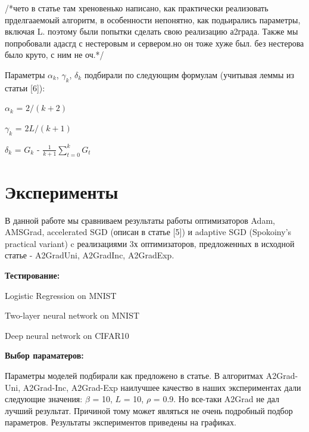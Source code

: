 \documentclass[a4paper,12pt]{article}
\theoremstyle{plain} %
\theoremstyle{definition} %
\theoremstyle{remark} %
\theoremstyle{definition}
\theoremstyle{definition}
\begin{document}
	
	/*чето в статье там хреновенько написано, как практически реализовать прделгааемоый алгоритм, в особенности непонятно, как подьирались параметры, включая L. поэтому были попытки сделать свою реализацию а2града.  Также мы попробовали адасгд с нестеровым и сервером.но он тоже хуже был. без нестерова было круто, с ним не оч.*/
	
	Параметры $\alpha_k$, $\gamma_k$, $\delta_k$ подбирали по следующим формулам (учитывая леммы из статьи [6]): 
	
	$\alpha_k$ = $2 / (k + 2)$
	
	$\gamma_k$ = $2L / (k + 1)$
	
	$\delta_k$ = $G_k$ - $\frac{1}{k+1} \sum^k_{t=0}{G_t}$
	
	\section{Эксперименты}
	
	
	В данной работе мы сравниваем результаты работы оптимизаторов Adam, AMSGrad, accelerated SGD (описан в статье [5]) и adaptive SGD (Spokoiny's practical variant) c реализациями 3х оптимизаторов, предложенных в исходной статье - A2GradUni, A2GradInc, A2GradExp. 
	
	\medskip
	\textbf{Тестирование:}
	
	Logistic Regression on MNIST
	
	Two-layer neural network on MNIST
	
	Deep neural network on CIFAR10
	
	\medskip
	
	\textbf{Выбор параматеров:} 
	
	Параметры моделей подбирали как предложено в статье. В алгоритмах A2Grad-Uni, A2Grad-Inc, A2Grad-Exp наилучшее качество в наших экспериментах дали следующие значения: $\beta$ = 10, $L$ = 10, $\rho$ = 0.9.    Но все-таки A2Grad не дал лучший результат. Причиной тому может являться не очень подробный подбор параметров. Результаты экспериментов приведены на графиках. 
	
	
	\medskip
	
	
	
	\medskip
	\medskip
	
	
	
\end{document}
